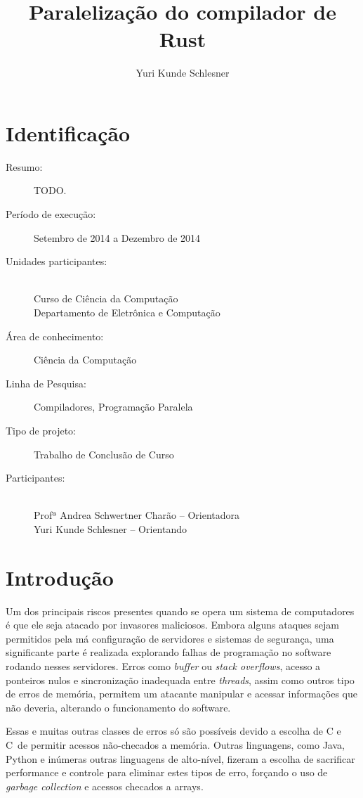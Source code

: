 \documentclass[12pt]{article}
\title{Paralelização do compilador de Rust}
\author{Yuri Kunde Schlesner}
\def\Cpp{{C\nolinebreak[4]\hspace{-.05em}\raisebox{.4ex}{\tiny\bf ++}}}
\newcommand{\todo}[1]{\textsf{\color{red}#1}}
\begin{document}
\maketitle

\section{Identificação}

\begin{description}
	\item[Resumo:] \todo{TODO.}
	\item[Período de execução:] Setembro de 2014 a Dezembro de 2014
	\item[Unidades participantes:] ~\\ Curso de Ciência da Computação \\ Departamento de Eletrônica e Computação
	\item[Área de conhecimento:] Ciência da Computação
	\item[Linha de Pesquisa:] Compiladores, Programação Paralela
	\item[Tipo de projeto:] Trabalho de Conclusão de Curso
	\item[Participantes:] ~\\ Profª Andrea Schwertner Charão -- Orientadora \\ Yuri Kunde Schlesner -- Orientando
\end{description}

\section{Introdução}

Um dos principais riscos presentes quando se opera um sistema de computadores é que ele seja atacado por invasores maliciosos. Embora alguns ataques sejam permitidos pela má configuração de servidores e sistemas de segurança, uma significante parte é realizada explorando falhas de programação no software rodando nesses servidores. Erros como \emph{buffer} ou \emph{stack overflows}, acesso a ponteiros nulos e sincronização inadequada entre \emph{threads}, assim como outros tipo de erros de memória, permitem um atacante manipular e acessar informações que não deveria, alterando o funcionamento do software. 

Essas e muitas outras classes de erros só são possíveis devido a escolha de C e \Cpp\ de permitir acessos não-checados a memória. Outras linguagens, como Java, Python e inúmeras outras linguagens de alto-nível, fizeram a escolha de sacrificar performance e controle para eliminar estes tipos de erro, forçando o uso de \emph{garbage collection} e acessos checados a arrays.
\end{document}
